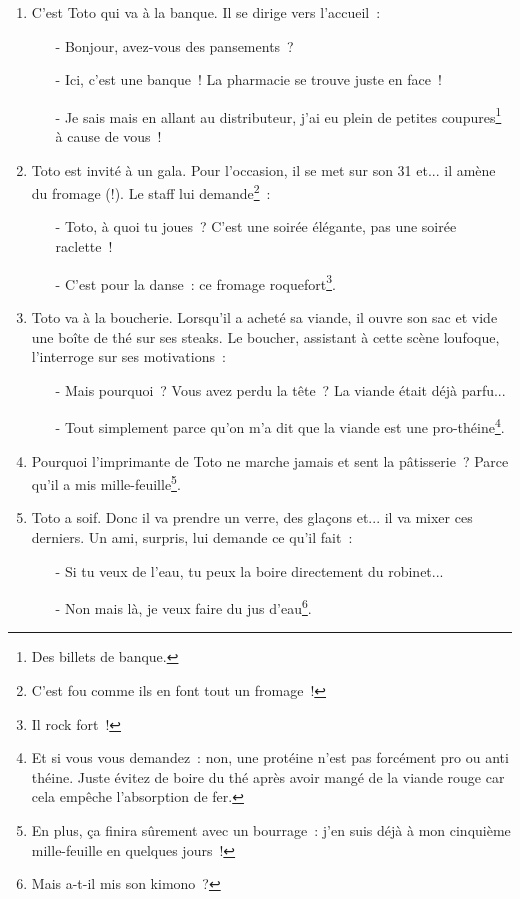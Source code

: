 \documentclass[10pt,a5paper,fullpage]{book}
\begin{document}
\begin{enumerate}
		\item C’est Toto qui va à la banque. Il se dirige vers l’accueil~:
		\begin{itemize}
			\item[-] Bonjour, avez-vous des pansements~?
			\item[-] Ici, c’est une banque~! La pharmacie se trouve juste en face~!
			\item[-] Je sais mais en allant au distributeur, j'ai eu plein de petites coupures\footnote{Des billets de banque.} à cause de vous~!
		\end{itemize}
		
		\item Toto est invité à un gala. Pour l'occasion, il se met sur son 31 et... il amène du fromage (!). Le staff lui demande\footnote{C'est fou comme ils en font tout un fromage~!}~:
		\begin{itemize}
			\item[-] Toto, à quoi tu joues~? C'est une soirée élégante, pas une soirée raclette~!
			\item[-] C'est pour la danse~: ce fromage roquefort\footnote{Il rock fort~!}.
		\end{itemize}
		
		\item Toto va à la boucherie. Lorsqu'il a acheté sa viande, il ouvre son sac et vide une boîte de thé sur ses steaks. Le boucher, assistant à cette scène loufoque, l'interroge sur ses motivations~:
		\begin{itemize}
			\item[-] Mais pourquoi~? Vous avez perdu la tête~? La viande était déjà parfu...
			\item[-] Tout simplement parce qu'on m'a dit que la viande est une pro-théine\footnote{Et si vous vous demandez~: non, une protéine n'est pas forcément pro ou anti théine. Juste évitez de boire du thé après avoir mangé de la viande rouge car cela empêche l'absorption de fer. }. 
		\end{itemize}
		
		\item Pourquoi l’imprimante de Toto ne marche jamais et sent la pâtisserie~? Parce qu’il a mis mille-feuille\footnote{En plus, ça finira sûrement avec un bourrage~: j'en suis déjà à mon cinquième mille-feuille en quelques jours~!}.
		
		\item Toto a soif. Donc il va prendre un verre, des glaçons et... il va mixer ces derniers. Un ami, surpris, lui demande ce qu'il fait~:
		\begin{itemize}
			\item[-] Si tu veux de l'eau, tu peux la boire directement du robinet...
			\item[-] Non mais là, je veux faire du jus d'eau\footnote{Mais a-t-il mis son kimono~?}. 
		\end{itemize}
	\end{enumerate}
	
\end{document}
